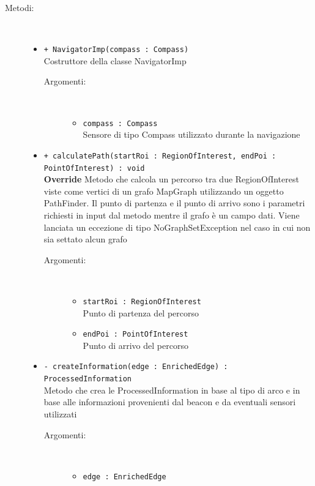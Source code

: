 \documentclass[../DefinizioneDiProdotto.tex]{subfiles}
\begin{document}
\begin{description}
\begin{itemize}
	\end{itemize}
	\item[Metodi:] \
	\begin{itemize}
		\item \texttt{+ NavigatorImp(compass : Compass)}\\
		Costruttore della classe NavigatorImp
		\begin{description}
			\item[Argomenti:] \
			\begin{itemize}
				\item \texttt{compass : Compass}\\
				Sensore di tipo Compass utilizzato durante la navigazione\end{itemize}
		\end{description}
		\item \texttt{+ calculatePath(startRoi : RegionOfInterest, endPoi : PointOfInterest) : void}\\
		\textbf{Override} Metodo che calcola un percorso tra due RegionOfInterest viste come vertici di un grafo MapGraph utilizzando un oggetto PathFinder. Il punto di partenza e il punto di arrivo sono i parametri richiesti in input dal metodo mentre il grafo è un campo dati. Viene lanciata un eccezione di tipo NoGraphSetException nel caso in cui non sia settato alcun grafo
		\begin{description}
			\item[Argomenti:] \
			\begin{itemize}
				\item \texttt{startRoi : RegionOfInterest}\\
				Punto di partenza del percorso\item \texttt{endPoi : PointOfInterest}\\
				Punto di arrivo del percorso\end{itemize}
		\end{description}
		\item \texttt{- createInformation(edge : EnrichedEdge) : ProcessedInformation}\\
		Metodo che crea le ProcessedInformation in base al tipo di arco e in base alle informazioni provenienti dal beacon e da eventuali sensori utilizzati
		\begin{description}
			\item[Argomenti:] \
			\begin{itemize}
				\item \texttt{edge : EnrichedEdge}\\

\end{itemize}
\end{description}
\end{itemize}
\end{description}
\end{document}
